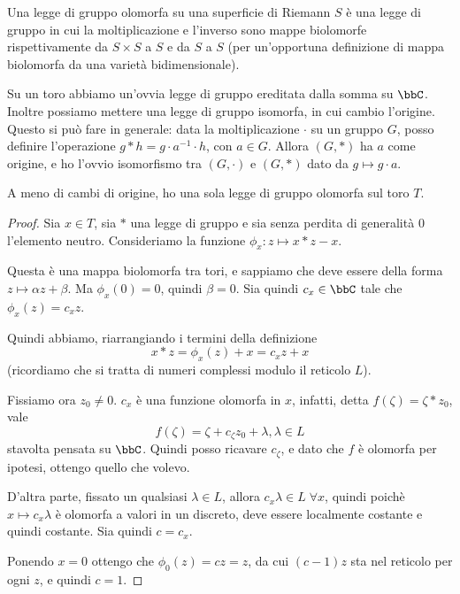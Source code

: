 	\begin{definizione}
		Una legge di gruppo olomorfa su una superficie di Riemann $S$ è una legge di gruppo in cui la moltiplicazione e l'inverso sono mappe biolomorfe rispettivamente da $S \times S$ a $S$ e da $S$ a $S$ (per un'opportuna definizione di mappa biolomorfa da una varietà bidimensionale).
	\end{definizione}
	
	Su un toro abbiamo un'ovvia legge di gruppo ereditata dalla somma su $\bbC$. Inoltre possiamo mettere una legge di gruppo isomorfa, in cui cambio l'origine. Questo si può fare in generale: data la moltiplicazione $\cdot$ su un gruppo $G$, posso definire l'operazione $g * h = g\cdot a^{-1}\cdot h$, con $a\in G$. Allora $(G,*)$ ha $a$ come origine, e ho l'ovvio isomorfismo tra $(G,\cdot)$ e $(G,*)$ dato da $g\mapsto g\cdot a$.
	
	\begin{proposizione}
		A meno di cambi di origine, ho una sola legge di gruppo olomorfa sul toro $T$.
	\end{proposizione}
	
	\begin{proof}
		Sia $x \in T$, sia $*$ una legge di gruppo e sia senza perdita di generalità $0$ l'elemento neutro. Consideriamo la funzione $\phi_x: z \mapsto x * z - x$.

		Questa è una mappa biolomorfa tra tori, e sappiamo che deve essere della forma $z \mapsto \alpha z + \beta$. Ma $\phi_x(0)=0$, quindi $\beta=0$. Sia quindi $c_x \in \bbC$ tale che $\phi_x(z)=c_xz$.
		
		Quindi abbiamo, riarrangiando i termini della definizione 
		\[
		 x*z = \phi_x(z) + x = c_xz + x
		\]
		(ricordiamo che si tratta di numeri complessi modulo il reticolo $L$).
		
		Fissiamo ora $z_0\ne 0$. $c_x$ è una funzione olomorfa in $x$, infatti, detta $f(\zeta) = \zeta * z_0$, vale
		\[
			f(\zeta) = \zeta + c_\zeta z_0 + \lambda, \lambda \in L
		\]
		stavolta pensata su $\bbC$. Quindi posso ricavare $c_\zeta$, e dato che $f$ è olomorfa per ipotesi, ottengo quello che volevo.
		
		D'altra parte, fissato un qualsiasi $\lambda \in L$, allora $c_x\lambda \in L \; \forall x$, quindi poichè $x \mapsto c_x \lambda$ è olomorfa a valori in un discreto, deve essere localmente costante e quindi costante. Sia quindi $c=c_x$.
		
		Ponendo $x=0$ ottengo che $\phi_0(z) = cz = z$, da cui $(c-1)z$ sta nel reticolo per ogni $z$, e quindi $c=1$.


	\end{proof}

